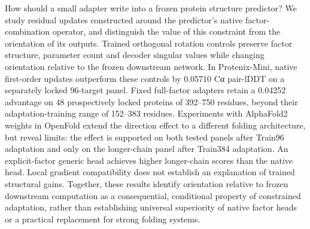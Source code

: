 How should a small adapter write into a frozen protein structure predictor? We study residual updates constructed around the predictor's native factor-combination operator, and distinguish the value of this constraint from the orientation of its outputs. Trained orthogonal rotation controls preserve factor structure, parameter count and decoder singular values while changing orientation relative to the frozen downstream network. In Protenix-Mini, native first-order updates outperform these controls by 0.05710 Cα pair-lDDT on a separately locked 96-target panel. Fixed full-factor adapters retain a 0.04252 advantage on 48 prospectively locked proteins of 392--750 residues, beyond their adaptation-training range of 152--383 residues. Experiments with AlphaFold2 weights in OpenFold extend the direction effect to a different folding architecture, but reveal limits: the effect is supported on both tested panels after Train96 adaptation and only on the longer-chain panel after Train384 adaptation. An explicit-factor generic head achieves higher longer-chain scores than the native head. Local gradient compatibility does not establish an explanation of trained structural gains. Together, these results identify orientation relative to frozen downstream computation as a consequential, conditional property of constrained adaptation, rather than establishing universal superiority of native factor heads or a practical replacement for strong folding systems.
